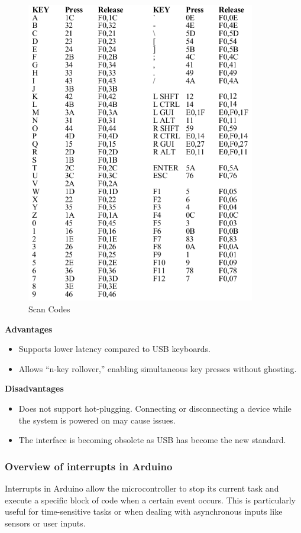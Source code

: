 \documentclass{article}
\numberwithin{equation}{section}
\numberwithin{figure}{section}
\numberwithin{table}{section}
\begin{document}
\begin{figure}[htbp]
    \includegraphics[width=10cm, keepaspectratio]{theps2protocol_1236112658.png}
    \centering
    \caption{Scan Codes}
    \label{fig:fig5}
\end{figure}

\textbf{Advantages}
\begin{itemize}
    \item Supports lower latency compared to USB keyboards.
    \item Allows ``n-key rollover,'' enabling simultaneous key presses without ghosting.
\end{itemize}

\textbf{Disadvantages}
\begin{itemize}
    \item Does not support hot-plugging. Connecting or disconnecting a device while the system is powered on may cause issues.
    \item The interface is becoming obsolete as USB has become the new standard.
\end{itemize}

\subsubsection{Overview of interrupts in Arduino}
Interrupts in Arduino allow the microcontroller to stop its current task and execute a specific block of code when a certain event occurs. This is particularly useful for time-sensitive tasks or when dealing with asynchronous inputs like sensors or user inputs.
\end{document}

